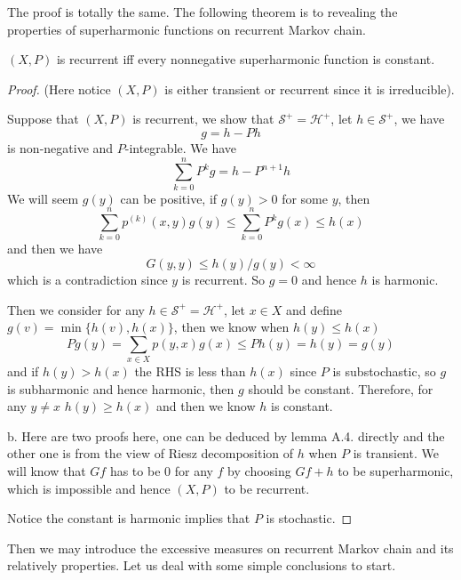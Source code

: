 \documentclass[lang=en,11pt,a4paper,citestyle =authoryear]{elegantpaper}
\newcommand{\Har}{\mathcal{H}}
\newcommand{\Sar}{\mathcal{S}}
\begin{document}
The proof is totally the same. The following theorem is to revealing the properties of superharmonic functions on recurrent Markov chain.

\begin{theorem}
    $(X,P)$ is recurrent iff every nonnegative superharmonic function is constant.
\end{theorem}
\begin{proof}
    (Here notice $(X,P)$ is either transient or recurrent since it is irreducible).\par
    Suppose that $(X,P)$ is recurrent, we show that $\Sar^+ = \Har^+$, let $h\in \Sar ^+$, we have
    \[g = h - Ph\]
    is non-negative and $P$-integrable. We have
    \[
    \sum_{k=0}^n P^kg = h-P^{n+1}h
    \]
    We will seem $g(y)$ can be positive, if $g(y) > 0$ for some $y$, then
    \[
    \sum\limits_{k=0}^{n}p^{(k)}(x,y)g(y) \leq \sum_{k=0}^n P^kg(x) \leq h(x)
    \]
    and then we have
    \[
    G(y,y) \leq h(y)/g(y) < \infty
    \]
    which is a contradiction since $y$ is recurrent. So $g = 0$ and hence $h$ is harmonic.\par
    Then we consider for any $h\in \Sar^+ = \Har^+$, let $x\in X$ and define $g(v) = \min\{h(v),h(x)\}$, then we know when $h(y) \leq h(x)$
    \[
    Pg(y) = \sum\limits_{x\in X}p(y,x) g(x) \leq Ph(y) = h(y) = g(y)
    \]
    and if $h(y) > h(x)$ the RHS is less than $h(x)$ since $P$ is substochastic, so $g$ is subharmonic and hence harmonic, then $g$ should be constant. Therefore, for any $y\neq x$ $h(y) \geq h(x)$ and then we know $h$ is constant.\par
    b. Here are two proofs here, one can be deduced by lemma A.4. directly and the other one is from the view of Riesz decomposition of $h$ when $P$ is transient. We will know that $Gf$ has to be $0$ for any $f$ by choosing $Gf+h$ to be superharmonic, which is impossible and hence $(X,P)$ to be recurrent.\par
    Notice the constant is harmonic implies that $P$ is stochastic.
\end{proof}

Then we may introduce the excessive measures on recurrent Markov chain and its relatively properties. Let us deal with some simple conclusions to start.
\end{document}

